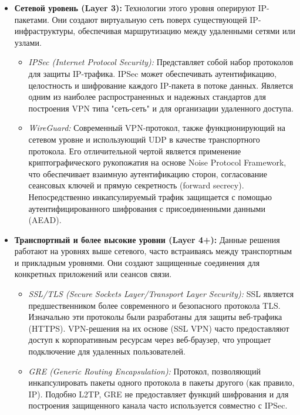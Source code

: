 \begin{itemize}
    \item \textbf{Сетевой уровень (Layer 3):}
    Технологии этого уровня оперируют IP-пакетами. Они создают виртуальную сеть поверх существующей IP-инфраструктуры, обеспечивая маршрутизацию между удаленными сетями или узлами.
    \begin{itemize}
        \item \textit{IPSec (Internet Protocol Security):} Представляет собой набор протоколов для защиты IP-трафика. IPSec может обеспечивать аутентификацию, целостность и шифрование каждого IP-пакета в потоке данных. Является одним из наиболее распространенных и надежных стандартов для построения VPN типа "сеть-сеть" и для организации удаленного доступа.
        \item \textit{WireGuard:} Современный VPN-протокол, также функционирующий на сетевом уровне и использующий UDP в качестве транспортного протокола. Его отличительной чертой является применение криптографического рукопожатия на основе Noise Protocol Framework, что обеспечивает взаимную аутентификацию сторон, согласование сеансовых ключей и прямую секретность (forward secrecy). Непосредственно инкапсулируемый трафик защищается с помощью аутентифицированного шифрования с присоединенными данными (AEAD).
    \end{itemize}

    \item \textbf{Транспортный и более высокие уровни (Layer 4+):}
    Данные решения работают на уровнях выше сетевого, часто встраиваясь между транспортным и прикладным уровнями. Они создают защищенные соединения для конкретных приложений или сеансов связи.
    \begin{itemize}
        \item \textit{SSL/TLS (Secure Sockets Layer/Transport Layer Security):} SSL является предшественником более современного и безопасного протокола TLS. Изначально эти протоколы были разработаны для защиты веб-трафика (HTTPS). VPN-решения на их основе (SSL VPN) часто предоставляют доступ к корпоративным ресурсам через веб-браузер, что упрощает подключение для удаленных пользователей.
        \item \textit{GRE (Generic Routing Encapsulation):} Протокол, позволяющий инкапсулировать пакеты одного протокола в пакеты другого (как правило, IP). Подобно L2TP, GRE не предоставляет функций шифрования и для построения защищенного канала часто используется совместно с IPSec.
    \end{itemize}
\end{itemize}

